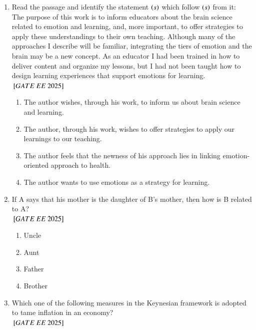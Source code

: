 \documentclass[journal,12pt,onecolumn]{IEEEtran}
\theoremstyle{remark}
\begin{document}
\begin{enumerate}
   \item Read the passage and identify the statement $\left(s\right)$ which follow $\left(s\right)$ from it: \\    
      The purpose of this work is to inform educators about the brain science related to emotion and learning, and, more important, to offer strategies to apply these understandings to their own teaching. Although many of the approaches I describe will be familiar, integrating the tiers of emotion and the brain may be a new concept. As an educator I had been trained in how to deliver content and organize my lessons, but I had not been taught how to design learning experiences that support emotions for learning. \\     
     ${}\left[GATE\ EE\ 2025\right]$\\
    \begin{enumerate}[label=(\Alph*)]
  \item  The author wishes, through his work, to inform us about brain science and learning. \\      
  \item The author, through his work, wishes to offer strategies to apply our learnings to our teaching. \\   
  \item The author feels that the newness of his approach lies in linking emotion-oriented approach to health.\\   
  \item The author wants to use emotions as a strategy for learning.\\   
    \end{enumerate}

   \item If A says that his mother is the daughter of B's mother, then how is B related to A? \\    
    ${}\left[GATE\ EE\ 2025\right]$\\
    \begin{enumerate}[label=(\Alph*)]
  \item Uncle\\      
  \item Aunt\\   
  \item Father\\   
  \item Brother\\   
    \end{enumerate}

    \item Which one of the following measures in the Keynesian framework is adopted to tame inflation in an economy? \\
    ${}\left[GATE\ EE\ 2025\right]$\\


\end{enumerate}
\end{document}
